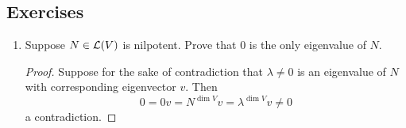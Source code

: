 \documentclass[../main.tex]{subfiles}
\begin{document}
\subsection*{Exercises}
\begin{enumerate}[label={\textbf{\arabic*}},labelsep=1em,ref={\thesection.\arabic*}]
    \item \label{exr:8.A.7}Suppose $N\in\mathcal{L}(V)$ is nilpotent. Prove that 0 is the only eigenvalue of $N$.
    \begin{proof}
        Suppose for the sake of contradiction that $\lambda\neq 0$ is an eigenvalue of $N$ with corresponding eigenvector $v$. Then
        \begin{equation*}
            0 = 0v = N^{\dim V}v = \lambda^{\dim V}v \neq 0
        \end{equation*}
        a contradiction.
    \end{proof}
\end{enumerate}
\end{document}
